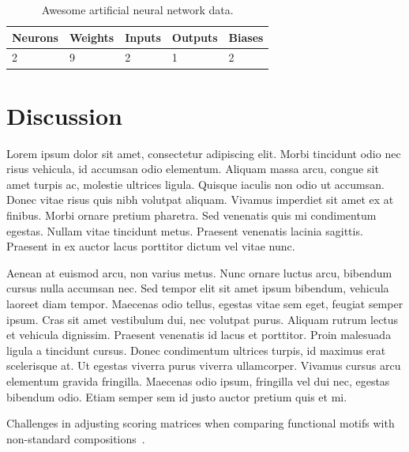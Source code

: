 \documentclass[twocolumn]{miniclass}
\begin{document}
\begin{table}[]
    \centering
    \begin{tabular}{|l|l|l|l|l|}
        \hline
        Neurons & Weights & Inputs & Outputs & Biases \\ \hline
        2              & 9       & 2      & 1       & 2      \\ \hline
    \end{tabular}
    \caption{Awesome artificial neural network data.}
    \label{tab:ann_arch}
\end{table}

\section{Discussion}
Lorem ipsum dolor sit amet, consectetur adipiscing elit. Morbi tincidunt odio nec risus vehicula, id accumsan odio elementum. Aliquam massa arcu, congue sit amet turpis ac, molestie ultrices ligula. Quisque iaculis non odio ut accumsan. Donec vitae risus quis nibh volutpat aliquam. Vivamus imperdiet sit amet ex at finibus. Morbi ornare pretium pharetra. Sed venenatis quis mi condimentum egestas. Nullam vitae tincidunt metus. Praesent venenatis lacinia sagittis. Praesent in ex auctor lacus porttitor dictum vel vitae nunc.

Aenean at euismod arcu, non varius metus. Nunc ornare luctus arcu, bibendum cursus nulla accumsan nec. Sed tempor elit sit amet ipsum bibendum, vehicula laoreet diam tempor. Maecenas odio tellus, egestas vitae sem eget, feugiat semper ipsum. Cras sit amet vestibulum dui, nec volutpat purus. Aliquam rutrum lectus et vehicula dignissim. Praesent venenatis id lacus et porttitor. Proin malesuada ligula a tincidunt cursus. Donec condimentum ultrices turpis, id maximus erat scelerisque at. Ut egestas viverra purus viverra ullamcorper. Vivamus cursus arcu elementum gravida fringilla. Maecenas odio ipsum, fringilla vel dui nec, egestas bibendum odio. Etiam semper sem id justo auctor pretium quis et mi.

Challenges in adjusting scoring matrices when comparing functional motifs with non-standard compositions~\cite{jarnot2024challenges}.



\end{document}
